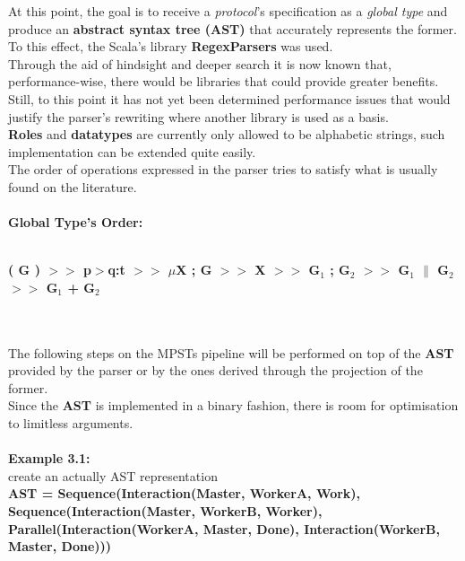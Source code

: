 \normalsize
At this point, the goal is to receive a \textit{protocol}'s specification as a \textit{global type} and produce an \textbf{abstract syntax tree (AST)} that accurately represents the former.\\
To this effect, the Scala's library \textbf{RegexParsers} was used.\\
Through the aid of hindsight and deeper search it is now known that, performance-wise, there would be libraries that could provide greater benefits. Still, to this point it has not yet been determined performance issues that would justify the parser's rewriting where another library is used as a basis.\\
\textbf{Roles} and \textbf{datatypes} are currently only allowed to be alphabetic strings, such implementation can be extended quite easily.\\ 
The order of operations expressed in the parser tries to satisfy what is usually found on the literature.\\
\\
\textbf{Global Type's Order:}\\
\\
\scriptsize
\centerline{\textbf{( G ) $>>$ p$>$q:t $>>$ $\mu$X ; G $>>$ X $>>$ G$_1$ ; G$_2$ $>>$ G$_1$ $\|$ G$_2$ $>>$ G$_1$ + G$_2$}}\\
\\
\normalsize
The following steps on the MPSTs pipeline will be performed on top of the \textbf{AST} provided by the parser or by the ones derived through the projection of the former.\\
Since the \textbf{AST} is implemented in a binary fashion, there is room for optimisation to limitless arguments.\\
\\
\textbf{Example 3.1:}\\
\scriptsize
create an actually AST representation\\
\textbf{AST = Sequence(Interaction(Master, WorkerA, Work), Sequence(Interaction(Master, WorkerB, Worker), Parallel(Interaction(WorkerA, Master, Done), Interaction(WorkerB, Master, Done)))}